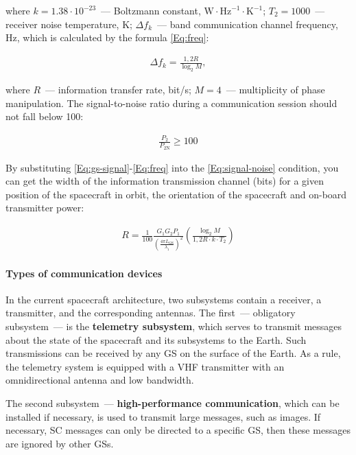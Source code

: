 \documentclass[12pt,a4paper]{article}
\begin{document}
where $k = 1.38 \cdot 10^{-23}$~--- Boltzmann constant, $\text{W} \cdot \text{Hz}^{-1}
\cdot \text{K}^{-1}$; $T_2 = 1000$~--- receiver noise temperature, K; $\Delta f_k$~--- band
communication channel frequency, Hz, which is calculated by the formula \ref{Eq:freq}:

\begin{eqnarray}
\Delta f_k = \frac{1,2 R}{\log_2{M}}, \label{Eq:freq}
\end{eqnarray}

where $R$~--- information transfer rate, bit/s; $M = 4$~--– multiplicity of phase manipulation. The signal-to-noise ratio during a communication session should not fall below 100:

\begin{eqnarray}
\frac{P_{2}}{P_{2\text{N}}} \geqslant 100 \label{Eq:signal-noise}
\end{eqnarray}

By substituting \ref{Eq:gs-signal}-\ref{Eq:freq} into the \ref{Eq:signal-noise} condition, you can get the width of the information transmission channel (bits) for a given position of the spacecraft in orbit, the orientation of the spacecraft and on-board transmitter power:

\begin{eqnarray}
R = \frac{1}{100} \frac{G_1 G_2 P_1}{\left( \frac{4 \pi L_{\text{GS}}}{\lambda_1}
  \right)^2} \left( \frac{\log_2{M}}{1,2 R \cdot k \cdot T_2} \right)
\end{eqnarray}

\paragraph{Types of communication devices}

In the current spacecraft architecture, two subsystems contain a receiver, a transmitter, and the corresponding antennas. The first~--- obligatory subsystem~--- is the \textbf{telemetry subsystem}, which serves to transmit messages about the state of the spacecraft and its subsystems to the Earth. Such transmissions can be received by any GS on the surface of the Earth. As a rule, the telemetry system is equipped with a VHF transmitter with an omnidirectional antenna and low bandwidth.

The second subsystem~--- \textbf{high-performance communication}, which can be installed if necessary, is used to transmit large messages, such as images. If necessary, SC messages can only be directed to a specific GS, then these messages are ignored by other GSs.
\end{document}
